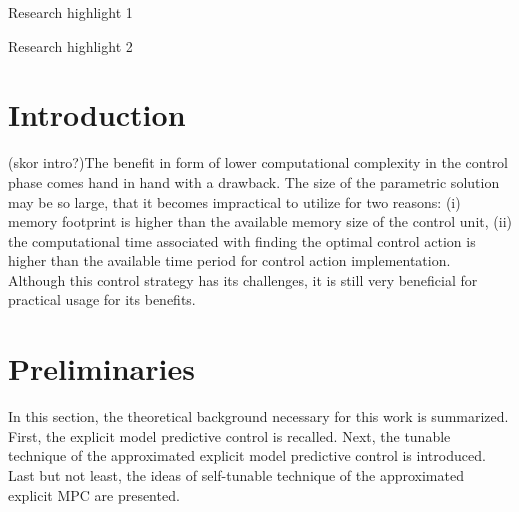 \documentclass[preprint,12pt]{elsarticle}
\begin{document}
\begin{frontmatter}
\begin{highlights}
\item Research highlight 1
\item Research highlight 2
\end{highlights}

\begin{keyword}



\end{keyword}

\end{frontmatter}


\section{Introduction}
\label{sec:introduction}
 
(skor intro?)The benefit in form of lower computational complexity in the control phase comes hand in hand with a drawback. The size of the parametric solution may be so large, that it becomes impractical to utilize for two reasons: (i) memory footprint is higher than the available memory size of the control unit, (ii) the computational time associated with finding the optimal control action is higher than the available time period for control action implementation. Although this control strategy has its challenges, it is still very beneficial for practical usage for its benefits. 

\section{Preliminaries}
\label{sec:preliminaries}
In this section, the theoretical background necessary for this work is summarized. First, the explicit model predictive control is recalled. Next, the tunable technique of the approximated explicit model predictive control is introduced. Last but not least, the ideas of self-tunable technique of the approximated explicit MPC are presented.
\end{document}
